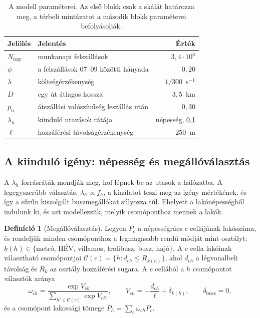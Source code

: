 \documentclass[12pt,a4paper]{article}
\theoremstyle{definition}
\newtheorem{definicio}[tetel]{Definíció}
\theoremstyle{remark}
\begin{document}
\begin{table}[!htbp]
\centering
\caption{A modell paraméterei. Az első blokk csak a skálát határozza meg, a
térbeli mintázatot a második blokk paraméterei befolyásolják.}
\label{tab:param}
\small
\begin{tabular}{llr}
\toprule
Jelölés & Jelentés & Érték \\
\midrule
$N_{\mathrm{nap}}$ & munkanapi felszállások \citep{bkk2024} & $3{,}4\cdot10^6$ \\
$\phi$ & a felszállások 07--09 közötti hányada & $0{,}20$ \\
\midrule
$\lambda$ & költségérzékenység & $1/300$~s$^{-1}$ \\
$D$ & egy út átlagos hossza & $3{,}5$~km \\
$p_{\mathrm{tr}}$ & átszállási valószínűség leszállás után & $0{,}30$ \\
$\lambda_h$ & kiinduló utazások rátája & népesség, \ref{sec:igeny} \\
$\ell$ & hozzáférési távolságérzékenység & $250$~m \\
\bottomrule
\end{tabular}
\end{table}

\subsection{A kiinduló igény: népesség és megállóválasztás}
\label{sec:igeny}

A $\lambda_h$ forrásráták mondják meg, hol lépnek be az utasok a hálózatba. A
legegyszerűbb választás, $\lambda_h\propto f_h$, a kínálatot teszi meg az
igény mértékének, és így a sűrűn kiszolgált buszmegállókat súlyozza túl.
Ehelyett a lakónépességből indulunk ki, és azt modellezzük, melyik
csomóponthoz mennek a lakók.

\begin{definicio}[Megállóválasztás]
Legyen $P_c$ a népességrács $c$ cellájának lakószáma, és rendeljük minden
csomóponthoz a legmagasabb rendű módját mint osztályt: $k(h)\in\{$metró,
HÉV, villamos, trolibusz, busz, hajó$\}$. A $c$ cella lakóinak választható
csomópontjai $\mathcal C(c)=\{h: d_{ch}\le R_{k(h)}\}$, ahol $d_{ch}$ a
légvonalbeli távolság és $R_k$ az osztály hozzáférési sugara. A $c$ cellából
a $h$ csomópontot választók aránya
\[
  \omega_{ch}=\frac{\exp V_{ch}}{\sum_{h'\in\mathcal C(c)}\exp V_{ch'}},
  \qquad V_{ch}=-\frac{d_{ch}}{\ell}+\delta_{k(h)},\qquad \delta_{\mathrm{busz}}=0,
\]
és a csomópont lakossági tömege $P_h=\sum_c\omega_{ch}P_c$.
\end{definicio}
\end{document}
